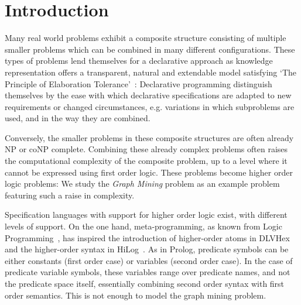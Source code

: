 \section{Introduction}
Many real world problems exhibit a composite structure consisting of multiple smaller problems which can be combined in many different configurations.
These types of problems lend themselves for a declarative approach as knowledge representation offers a transparent, natural and extendable model satisfying `The Principle of Elaboration Tolerance'~\citep{elaboration_tolerance}: 
Declarative programming distinguish themselves by the ease with which declarative specifications are adapted to new requirements or changed circumstances, e.g. variations in which subproblems are used, and in the way they are combined.

Conversely, the smaller problems in these composite structures are often already NP or coNP complete.
Combining these already complex problems often raises the computational complexity of the composite problem, up to a level where it cannot be expressed using first order logic.
These problems become higher order logic problems: We study the \emph{Graph Mining} problem as an example problem featuring such a raise in complexity.

Specification languages with support for higher order logic exist, with different levels of support.
On the one hand, meta-programming, as known from Logic Programming~\citep{abramson1989meta}, has inspired the introduction of higher-order atoms in DLVHex~\citep{conf/ijcai/EiterIST05}  and the higher-order syntax in HiLog~\citep{chen1993hilog}.
As in Prolog, predicate symbols can be either constants (first order case) or variables (second order case).
In the case of predicate variable symbols, these variables range over predicate names, and not the predicate space itself, essentially combining second order syntax with first order semantics. 
This is not enough to model the graph mining problem.

